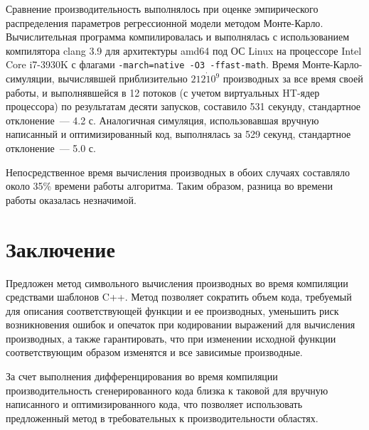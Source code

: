 \documentclass[11pt,a4paper]{article}
\begin{document}
Сравнение производительность выполнялось при оценке эмпирического распределения
параметров регрессионной модели методом Монте-Карло\cite{Rudoy15MonteCarlo}.
Вычислительная программа компилировалась и выполнялась с использованием компилятора
clang 3.9 для архитектуры amd64 под ОС Linux на процессоре Intel Core i7-3930K
с флагами \texttt{-march=native -O3 -ffast-math}. Время Монте-Карло-симуляции,
вычислявшей приблизительно $212 \dot 10^9$ производных за все время своей работы,
и выполнявшейся в 12 потоков (с учетом виртуальных HT-ядер процессора) по результатам
десяти запусков, составило 531 секунду, стандартное отклонение~--- 4.2 с.
Аналогичная симуляция, использовавшая вручную написанный и оптимизированный код,
выполнялась за 529 секунд, стандартное отклонение~--- 5.0 с.

Непосредственное время вычисления производных в обоих случаях составляло около
35\% времени работы алгоритма. Таким образом, разница во времени работы оказалась
незначимой.

\section{Заключение}

Предложен метод символьного вычисления производных во время компиляции средствами
шаблонов C++. Метод позволяет сократить объем кода, требуемый для описания
соответствующей функции и ее производных, уменьшить риск возникновения ошибок и
опечаток при кодировании выражений для вычисления производных, а также гарантировать,
что при изменении исходной функции соответствующим образом изменятся и все зависимые
производные.

За счет выполнения дифференцирования во время компиляции производительность
сгенерированного кода близка к таковой для вручную написанного и оптимизированного
кода, что позволяет использовать предложенный метод в требовательных к производительности
областях.


%
%

\end{document}
